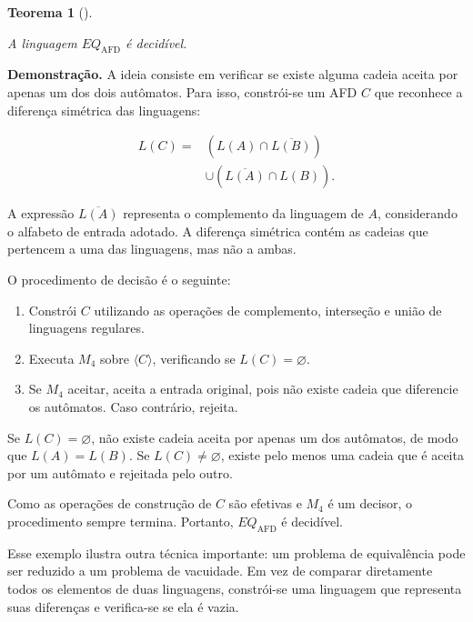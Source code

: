 \documentclass[
  brazilian,
  letterpaper,
]{book}
\providecommand{\tightlist}{%
  \setlength{\itemsep}{0pt}\setlength{\parskip}{0pt}}
\theoremstyle{plain}
\newtheorem{theorem}{Teorema}[chapter]
\theoremstyle{definition}
\theoremstyle{remark}
\begin{document}
\begin{theorem}[]\protect\hypertarget{thm-eq-afd}{}\label{thm-eq-afd}

A linguagem \(EQ_{\mathrm{AFD}}\) é decidível.

\end{theorem}

\textbf{Demonstração.} A ideia consiste em verificar se existe alguma
cadeia aceita por apenas um dos dois autômatos. Para isso, constrói-se
um AFD \(C\) que reconhece a diferença simétrica das linguagens:

\[
\begin{aligned}
L(C)={}&(L(A)\cap\overline{L(B)})\\
&\cup(\overline{L(A)}\cap L(B)).
\end{aligned}
\]

A expressão \(\overline{L(A)}\) representa o complemento da linguagem de
\(A\), considerando o alfabeto de entrada adotado. A diferença simétrica
contém as cadeias que pertencem a uma das linguagens, mas não a ambas.

O procedimento de decisão é o seguinte:

\begin{enumerate}
\def\labelenumi{\arabic{enumi}.}
\tightlist
\item
  Constrói \(C\) utilizando as operações de complemento, interseção e
  união de linguagens regulares.
\item
  Executa \(M_4\) sobre \(\langle C\rangle\), verificando se
  \(L(C)=\varnothing\).
\item
  Se \(M_4\) aceitar, aceita a entrada original, pois não existe cadeia
  que diferencie os autômatos. Caso contrário, rejeita.
\end{enumerate}

Se \(L(C)=\varnothing\), não existe cadeia aceita por apenas um dos
autômatos, de modo que \(L(A)=L(B)\). Se \(L(C)\neq\varnothing\), existe
pelo menos uma cadeia que é aceita por um autômato e rejeitada pelo
outro.

Como as operações de construção de \(C\) são efetivas e \(M_4\) é um
decisor, o procedimento sempre termina. Portanto, \(EQ_{\mathrm{AFD}}\)
é decidível.

Esse exemplo ilustra outra técnica importante: um problema de
equivalência pode ser reduzido a um problema de vacuidade. Em vez de
comparar diretamente todos os elementos de duas linguagens, constrói-se
uma linguagem que representa suas diferenças e verifica-se se ela é
vazia.
\end{document}
